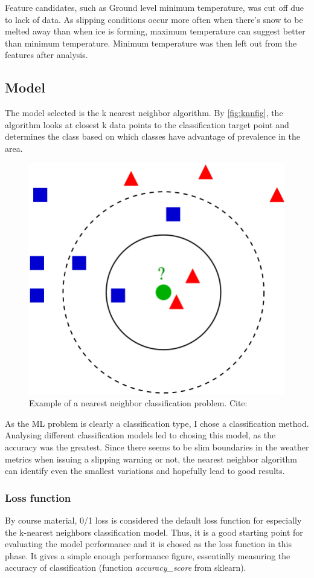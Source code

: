 \documentclass[12pt, a4paper]{report}
\begin{document}
    Feature candidates, such as Ground level minimum temperature, was cut off due to lack of data.
    As slipping conditions occur more often when there's snow to be melted away than when ice is forming, maximum temperature can
    suggest better than minimum temperature. Minimum temperature was then left out from the features after analysis.

    \subsection{Model}
    The model selected is the k nearest neighbor algorithm. By \autoref{fig:knnfig}, the algorithm looks at closest k data points
    to the classification target point and determines the class based on which classes have advantage of prevalence in the area.
    \begin{figure}
      \caption{Example of a nearest neighbor classification problem. Cite: \cite{knnimage}}\label{fig:knnfig}
      \centering
      \includegraphics[width=0.4\columnwidth]{KnnClassification.svg.png}
    \end{figure}

    As the ML problem is clearly a classification type, I chose a classification method.
    Analysing different classification models led to chosing this model, as the accuracy was the greatest. 
    Since there seems to be slim boundaries in the weather metrics when issuing a slipping warning or not, the nearest neighbor
    algorithm can identify even the smallest variations and hopefully lead to good results.

    \subsubsection{Loss function}
    By course material, 0/1 loss is considered the default loss function for especially the k-nearest neighbors classification model. Thus, it is a 
    good starting point for evaluating the model performance and it is chosed as the loss function in this phase. It gives a 
    simple enough performance figure, essentially measuring the accuracy of classification (function \textit{accuracy\_score} from sklearn).
\end{document}
